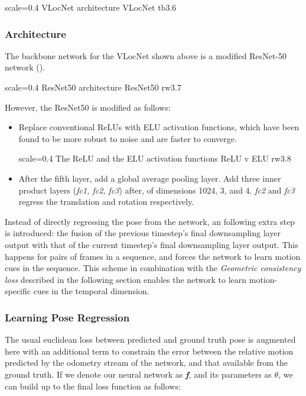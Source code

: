 {scale=0.4}%
{VLocNet architecture}%
{VLocNet}%
{tb3.6} %

\subsubsection{Architecture}
The backbone network for the VLocNet shown above is a modified ResNet-50 network (\cite{He2015}).

{scale=0.4}%
{ResNet50 architecture}%
{ResNet50}%
{rw3.7} %

However, the ResNet50 is modified as follows:

\begin{itemize}
	\item Replace conventional ReLUs with ELU activation functions, which have been found to be more robust to noise and are faster to converge.
	
    {scale=0.4}%
    {The ReLU and the ELU activation functions}%
    {ReLU v ELU}%
	{rw3.8} %

	\item After the fifth layer, add a global average pooling layer. Add three inner product layers (\textit{fc1, fc2, fc3}) after, of dimensions 1024, 3, and 4.
\emph{fc2} and \emph{fc3} regress the translation and rotation respectively. 
\end{itemize}

	Instead of directly regressing the pose from the network, an following extra step is introduced: the fusion of the previous timestep's final downsampling layer output
with that of the current timestep's final downsampling layer output. This happens for pairs of frames in a sequence, and forces the network to learn motion cues in the sequence.
This scheme in combination with the \emph{Geometric consistency loss} described in the following section enables the network to learn motion-specific cues in the 
temporal dimension.

\subsubsection{Learning Pose Regression}
The usual euclidean loss between predicted and ground truth pose is augmented here with an additional term to constrain the error between the relative motion predicted
by the odometry stream of the network, and that available from the ground truth. If we denote our neural network as \textbf{\emph{f}}, and its parameters as $\theta$, we 
can build up to the final loss function as follows:

